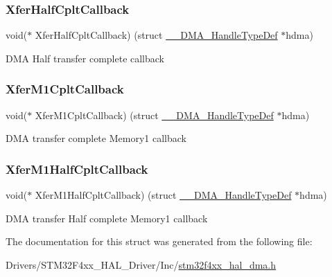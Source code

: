 \subsubsection{\texorpdfstring{Xfer\+Half\+Cplt\+Callback}{XferHalfCpltCallback}}
{\footnotesize\ttfamily void($\ast$  Xfer\+Half\+Cplt\+Callback) (struct \mbox{\hyperlink{struct_____d_m_a___handle_type_def}{\+\_\+\+\_\+\+D\+M\+A\+\_\+\+Handle\+Type\+Def}} $\ast$hdma)}

D\+MA Half transfer complete callback \mbox{\label{struct_____d_m_a___handle_type_def_a7223b08d7509224b3050254ad7462463}} 
\subsubsection{\texorpdfstring{Xfer\+M1\+Cplt\+Callback}{XferM1CpltCallback}}
{\footnotesize\ttfamily void($\ast$  Xfer\+M1\+Cplt\+Callback) (struct \mbox{\hyperlink{struct_____d_m_a___handle_type_def}{\+\_\+\+\_\+\+D\+M\+A\+\_\+\+Handle\+Type\+Def}} $\ast$hdma)}

D\+MA transfer complete Memory1 callback \mbox{\label{struct_____d_m_a___handle_type_def_aaa7180782f4a39696344c25766085d10}} 
\subsubsection{\texorpdfstring{Xfer\+M1\+Half\+Cplt\+Callback}{XferM1HalfCpltCallback}}
{\footnotesize\ttfamily void($\ast$  Xfer\+M1\+Half\+Cplt\+Callback) (struct \mbox{\hyperlink{struct_____d_m_a___handle_type_def}{\+\_\+\+\_\+\+D\+M\+A\+\_\+\+Handle\+Type\+Def}} $\ast$hdma)}

D\+MA transfer Half complete Memory1 callback 

The documentation for this struct was generated from the following file\+:\begin{DoxyCompactItemize}
\item 
Drivers/\+S\+T\+M32\+F4xx\+\_\+\+H\+A\+L\+\_\+\+Driver/\+Inc/\mbox{\hyperlink{stm32f4xx__hal__dma_8h}{stm32f4xx\+\_\+hal\+\_\+dma.\+h}}\end{DoxyCompactItemize}
